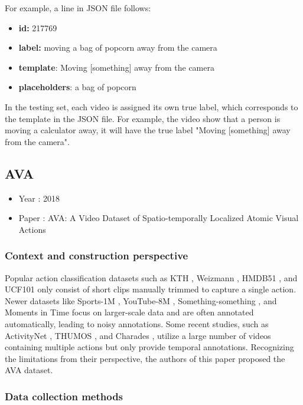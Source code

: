 \documentclass[10pt,onecolumn,letterpaper]{article}
\begin{document}
For example, a line in JSON file follows:
\begin{itemize}
\item \textbf{id:} 217769
\item \textbf{label:} moving a bag of popcorn away from the camera
\item \textbf{template}: Moving [something] away from the camera
\item \textbf{placeholders}: a bag of popcorn
\end{itemize}
In the testing set, each video is assigned its own true label, which corresponds to the template in the JSON file. For example, the video show that a person is moving a calculator away, it will have the true label "Moving [something] away from the camera".
\subsection{AVA}

\begin{itemize}
	\item Year : 2018
	\item Paper : AVA: A Video Dataset of Spatio-temporally Localized Atomic Visual
	Actions \cite{AVA}
\end{itemize}

\subsubsection{\textbf{Context and construction perspective}}

Popular action classification datasets such as KTH \cite{KTH}, Weizmann
\cite{Weizmann}, HMDB51 \cite{HMDB51}, and UCF101 \cite{UCF101} only consist of
short clips manually trimmed to capture a single action. Newer datasets like
Sports-1M \cite{Sports1M}, YouTube-8M \cite{YouTube8M}, Something-something
\cite{somethingsomething}, and Moments in Time \cite{momentsintime} focus on
larger-scale data and are often annotated automatically, leading to noisy
annotations. Some recent studies, such as ActivityNet \cite{ActivityNet}, THUMOS
\cite{THUMOS}, and Charades \cite{Charades}, utilize a large number of videos
containing multiple actions but only provide temporal annotations. Recognizing
the limitations from their perspective, the authors of this paper proposed the
AVA dataset.

\subsubsection{Data collection methods}
\end{document}

